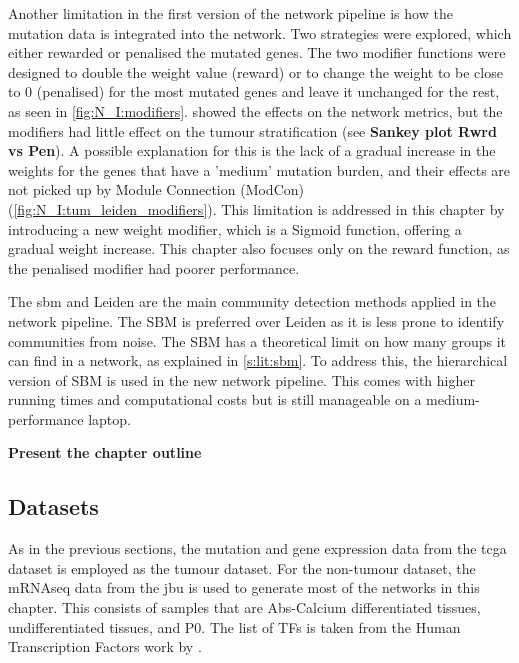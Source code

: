 Another limitation in the first version of the network pipeline is how the mutation data is integrated into the network. Two strategies were explored, which either rewarded or penalised the mutated genes. The two modifier functions were designed to double the weight value (reward) or to change the weight to be close to 0 (penalised) for the most mutated genes and leave it unchanged for the rest, as seen in \cref{fig:N_I:modifiers}.  showed the effects on the network metrics, but the modifiers had little effect on the tumour stratification (see \textbf{Sankey plot Rwrd vs Pen}). A possible explanation for this is the lack of a gradual increase in the weights for the genes that have a 'medium' mutation burden, and their effects are not picked up by Module Connection (ModCon) (\cref{fig:N_I:tum_leiden_modifiers}). This limitation is addressed in this chapter by introducing a new weight modifier, which is a Sigmoid function, offering a gradual weight increase. This chapter also focuses only on the reward function, as the penalised modifier had poorer performance.


The \acrfull{sbm} and Leiden are the main community detection methods applied in the network pipeline. The SBM is preferred over Leiden as it is less prone to identify communities from noise. The SBM has a theoretical limit on how many groups it can find in a network, as explained in \cref{s:lit:sbm}. To address this, the hierarchical version of SBM is used in the new network pipeline. This comes with higher running times and computational costs but is still manageable on a medium-performance laptop.

\textbf{Present the chapter outline}


\subsection{Datasets}

As in the previous sections, the mutation and gene expression data from the \acrshort{tcga} dataset is employed as the tumour dataset. For the non-tumour dataset, the mRNAseq data from the \acrfull{jbu} is used to generate most of the networks in this chapter. This consists of samples that are Abs-Calcium differentiated tissues, undifferentiated tissues, and P0. The list of TFs is taken from the Human Transcription Factors work by \citet{Lambert2018-el}.



